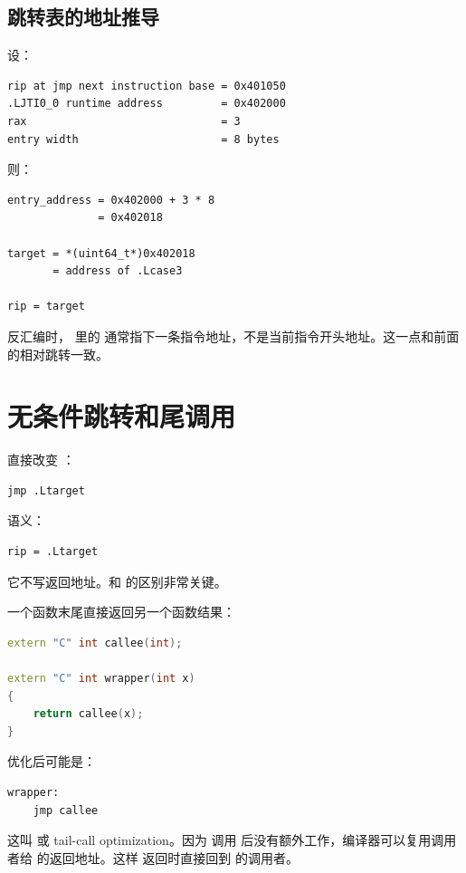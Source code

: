 \subsection{跳转表的地址推导}

设：

\begin{lstlisting}
rip at jmp next instruction base = 0x401050
.LJTI0_0 runtime address         = 0x402000
rax                              = 3
entry width                      = 8 bytes
\end{lstlisting}

则：

\begin{lstlisting}
entry_address = 0x402000 + 3 * 8
              = 0x402018

target = *(uint64_t*)0x402018
       = address of .Lcase3

rip = target
\end{lstlisting}

反汇编时， 里的  通常指下一条指令地址，不是当前指令开头地址。这一点和前面的相对跳转一致。

\section{无条件跳转和尾调用}

 直接改变 ：

\begin{lstlisting}
jmp .Ltarget
\end{lstlisting}

语义：

\begin{lstlisting}
rip = .Ltarget
\end{lstlisting}

它不写返回地址。和  的区别非常关键。

一个函数末尾直接返回另一个函数结果：

\begin{lstlisting}[language=C++]
extern "C" int callee(int);

extern "C" int wrapper(int x)
{
    return callee(x);
}
\end{lstlisting}

优化后可能是：

\begin{lstlisting}
wrapper:
    jmp callee
\end{lstlisting}

这叫  或 tail-call optimization。因为  调用  后没有额外工作，编译器可以复用调用者给  的返回地址。这样  返回时直接回到  的调用者。

